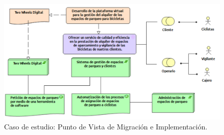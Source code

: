\begin{figure}[h]
	\centering
	\includegraphics[width=1.0\textwidth]{imagenes/Caso_Estudio/Migracion/Migracion_Implementacion.PDF}
	\caption{Caso de estudio: Punto de Vista de Migración e Implementación.}
	\label{fig:gap_analysis}
\end{figure}

